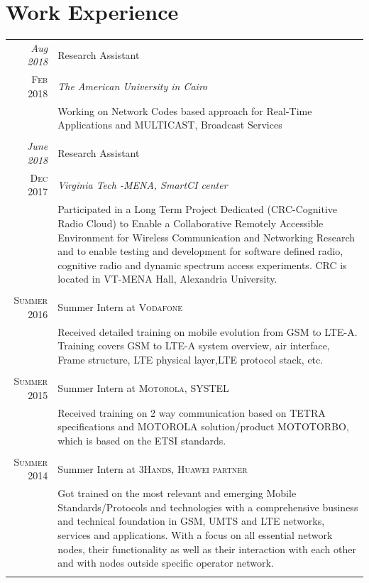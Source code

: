\documentclass[a4paper,10pt]{article}
\begin{document}
\section{Work Experience}
\begin{tabular}{r|p{11cm}}
 \emph{Aug 2018} & Research Assistant \\\textsc{Feb 2018}&\emph{The American University in Cairo} \\&\footnotesize{Working on Network Codes based approach for Real-Time Applications and MULTICAST, Broadcast Services}\\\multicolumn{2}{c}{} \\
 
 
 \emph{June 2018} & Research Assistant \\\textsc{Dec 2017}&\emph{Virginia Tech -MENA, SmartCI center} \\&\footnotesize{Participated in a Long Term Project Dedicated (CRC-Cognitive Radio Cloud) to Enable a Collaborative Remotely Accessible Environment for Wireless Communication and Networking Research and to enable testing and development for software defined radio, cognitive radio and dynamic spectrum access experiments. CRC is located in VT-MENA Hall, Alexandria University.} \\\multicolumn{2}{c}{} \\


\textsc{Summer 2016} & Summer Intern at \textsc{ Vodafone} \\&\footnotesize{Received detailed training on mobile evolution from GSM to LTE-A. Training covers GSM to LTE-A system overview, air interface, Frame structure, LTE physical layer,LTE protocol stack, etc. }\\\multicolumn{2}{c}{} \\

\textsc{Summer 2015} & Summer Intern at \textsc{Motorola, SYSTEL} \\&\footnotesize{Received training on 2 way communication based on TETRA specifications and MOTOROLA solution/product MOTOTORBO, which is based on the ETSI standards. }\\\multicolumn{2}{c}{} \\

\textsc{Summer 2014} & Summer Intern at \textsc{3Hands, Huawei partner} \\&\footnotesize{ Got trained on the most relevant and emerging Mobile Standards/Protocols and technologies with a comprehensive business and technical foundation in GSM, UMTS and LTE networks, services and applications. With a focus on all essential network nodes, their functionality as well as their interaction with each other and with nodes outside specific operator network. }\\\multicolumn{2}{c}{} \\


\end{tabular}
\end{document}
